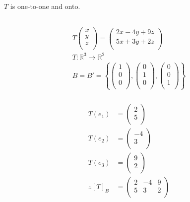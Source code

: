 \documentclass[fleqn, a4paper]{amsart}
\theoremstyle{definition}
\theoremstyle{theorem}
\theoremstyle{remark}
\numberwithin{corollary}{theorem}
\numberwithin{equation}{theorem}
\begin{document}
\begin{multicols}{1}
$T$ is one-to-one and onto.

\subsection{}

\begin{gather*}
	T 
		\begin{pmatrix}
			x\\
			y\\
			z\\
		\end{pmatrix}
	=
		\begin{pmatrix}
			2x - 4y + 9z\\
			5x + 3y + 2z\\
		\end{pmatrix}\\
	T : \mathbb{R}^3 \to \mathbb{R}^2\\
	B = B' = 
		\left\lbrace
			\begin{pmatrix}
				1\\
				0\\
				0\\
			\end{pmatrix}
			,
			\begin{pmatrix}
				0\\
				1\\
				0\\
			\end{pmatrix}
			,
			\begin{pmatrix}
				0\\
				0\\
				1\\
			\end{pmatrix}
		\right\rbrace
\end{gather*}

\subsubsection{}

\begin{align*}
	T(e_1) &=
		\begin{pmatrix}
			2\\
			5\\
		\end{pmatrix}\\
	T(e_2) &=
		\begin{pmatrix}
			-4\\
			3\\
		\end{pmatrix}\\
	T(e_3) &=
		\begin{pmatrix}
			9\\
			2\\
		\end{pmatrix}\\
	\therefore [T]_B &= 
		\begin{pmatrix}
			2 & -4 & 9\\
			5 & 3 & 2\\
		\end{pmatrix}
\end{align*}


\end{multicols}
\end{document}
